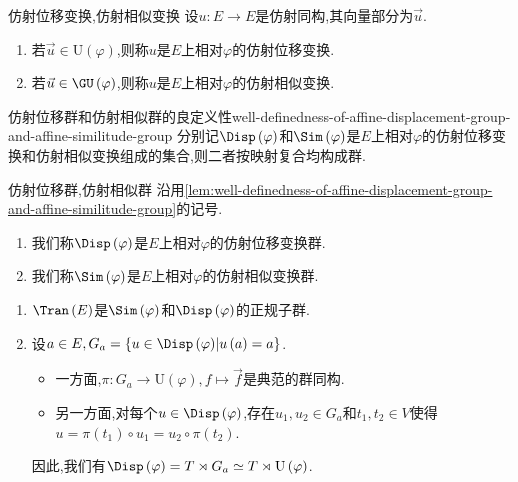 \begin{definition}{仿射位移变换,仿射相似变换}{}
	设$u:E\to E$是仿射同构,其向量部分为$\vec{u}$.
	\begin{enumerate}
		\item 若$\vec{u}\in\mathrm{U}\left(\varphi\right)$,则称$u$是$E$上相对$\varphi$的仿射位移变换.
		\item 若$\vec{u}\in\GU\left(\varphi\right)$,则称$u$是$E$上相对$\varphi$的仿射相似变换.
	\end{enumerate}
\end{definition}

\begin{lemma}{仿射位移群和仿射相似群的良定义性}{well-definedness-of-affine-displacement-group-and-affine-similitude-group}
	分别记$\Disp\left(\varphi\right)$和$\Sim\left(\varphi\right)$是$E$上相对$\varphi$的仿射位移变换和仿射相似变换组成的集合,则二者按映射复合均构成群.
\end{lemma}

\begin{definition}{仿射位移群,仿射相似群}{}
	沿用\cref{lem:well-definedness-of-affine-displacement-group-and-affine-similitude-group}的记号.
	\begin{enumerate}
		\item 我们称$\Disp\left(\varphi\right)$是$E$上相对$\varphi$的仿射位移变换群.
		\item 我们称$\Sim\left(\varphi\right)$是$E$上相对$\varphi$的仿射相似变换群.
	\end{enumerate}
\end{definition}

\begin{remark}{}{}
	\begin{enumerate}
		\item $\Tran\left(E\right)$是$\Sim\left(\varphi\right)$和$\Disp\left(\varphi\right)$的正规子群.
		\item 设$a\in E,G_{a}=\left\{u\in\Disp\left(\varphi\right)\middle|u\left(a\right)=a\right\}$.
		\begin{itemize}
			\item 一方面,$\pi:G_{a}\to\mathrm{U}\left(\varphi\right),f\mapsto\vec{f}$是典范的群同构.
			\item 另一方面,对每个$u\in\Disp\left(\varphi\right)$,存在$u_{1},u_{2}\in G_{a}$和$t_{1},t_{2}\in V$使得$u=\pi\left(t_{1}\right)\circ u_{1}=u_{2}\circ\pi\left(t_{2}\right)$.
		\end{itemize}
		因此,我们有$\Disp\left(\varphi\right)=T\rtimes G_{a}\simeq T\rtimes\mathrm{U}\left(\varphi\right)$.
	\end{enumerate}
\end{remark}

